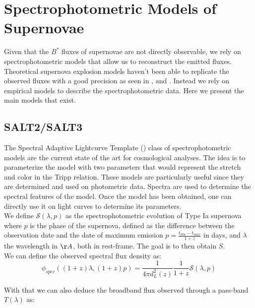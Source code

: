 \section{Spectrophotometric Models of Supernovae} \label{sec:spec_phot_model}

Given that the $B^*$ fluxes of supernovae are not directly observable, we rely on spectrophotometric models that allow us to reconstruct the emitted fluxes. Theoretical supernova 
explosion models haven't been able to replicate the observed fluxes with a good precision as seen in \cite{Blinnikov_2006_difficult_theory}, \cite{R_pke_2018_difficult_theory} 
and \cite{Pakmor_2024_difficult_theory}. Instead we rely on empirical models to describe the spectrophotometric data. Here we present the main models that exist. \\ 

\subsection{SALT2/SALT3} \label{sec:SALT2}

The Spectral Adaptive Lightcurve Template (\cite{Guy_2007_SALT2}) class of spectrophotometric models are the current state of the art for cosmological analyses. The idea is to parameterize the model with two parameters that would 
represent the stretch and color in the Tripp relation. These models are particularly useful since they are determined and used on photometric data. 
Spectra are used to determine the spectral features of the model. Once the model has been obtained, one can directly use it on light curves to determine its parameters. \\

We define $\mathcal{S}(\lambda, p)$ as the spectrophotometric evolution of 
Type Ia supernova where $p$ is the phase of the supernova, defined as the difference between the observation date and the date of maximum emission $p = \frac{t_{\text{obs}} - t_{max}}{1+z}$ in days, 
and $\lambda$ the wavelength in $\AA$, both in rest-frame. The goal is to then obtain $S$. \\

We can define the observed spectral flux density as:
\begin{equation}
    \phi_{spec}((1+z)\lambda, (1+z)p) = \frac{1}{4\pi d_L^2(z)} \frac{1}{1+z} \mathcal{S}(\lambda, p) 
    \label{eqn:spectral_flux_density}
\end{equation}

With that we can also deduce the broadband flux observed through a pass-band $T(\lambda)$ as: 

